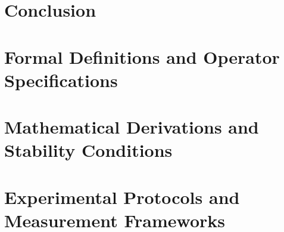 \documentclass[12pt]{article}
\begin{document}

\section{Conclusion}



\appendix

\section{Formal Definitions and Operator Specifications}


\section{Mathematical Derivations and Stability Conditions}


\section{Experimental Protocols and Measurement Frameworks}

\end{document}
